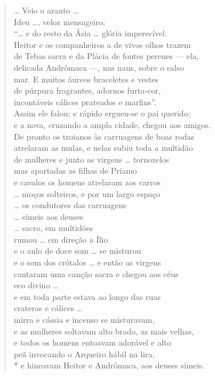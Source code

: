 {\begin{verse}
\ldots{} Veio o arauto \ldots{}\\
Ideu \ldots{}, veloz mensageiro:\\
“\ldots{} e do resto da Ásia \ldots{} glória imperecível.\\
Heitor e os companheiros a de vivos olhos trazem\\
de Tebas sacra e da Plácia de fontes perenes --- ela,\\
delicada Andrômaca ---, nas naus, sobre o salso\\
mar. E muitos áureos braceletes e vestes\\
de púrpura fragrantes, adornos furta-cor,\\
incontáveis cálices prateados e marfins”.\\
Assim ele falou; e rápido ergueu-se o pai querido;\\
e a nova, cruzando a ampla cidade, chegou aos \qb{}amigos.\\
De pronto os troianos às carruagens de boas rodas\\
atrelaram as mulas, e nelas subiu toda a multidão \\
de mulheres e junto as virgens \ldots{} tornozelos\\
mas apartadas as filhas de Príamo\\
e cavalos os homens atrelaram aos carros\\
\ldots{} moços solteiros, e por um largo espaço \\
\ldots{} os condutores das carruagens \\
\ldots{} símeis aos deuses\\
\ldots{} sacro, em multidões\\
rumou \ldots{} em direção a Ílio\\
e o aulo de doce som \ldots{} se misturou\\
e o som dos crótalos \ldots{} e então as virgens\\
cantaram uma canção sacra e chegou aos céus\\
eco divino \ldots{}\\
e em toda parte estava ao longo das ruas\\
crateras e cálices \ldots{}\\
mirra e cássia e incenso se misturavam,\\
e as mulheres soltavam alto brado, as mais velhas,\\
e todos os homens entoavam adorável e alto\\
peã invocando o Arqueiro hábil na lira,\\*
e hineavam Heitor e Andrômaca, aos deuses \qb{}símeis.
\end{verse}

}
